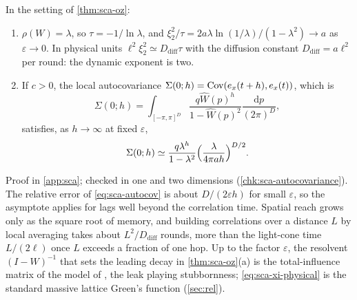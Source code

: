 \begin{proposition}\label{prop:sca-diffusive-scaling}
In the setting of \cref{thm:sca-oz}:
\begin{enumerate}
\item[(a)] $\rho(W)=\lambda$, so $\tau=-1/\ln\lambda$, and $\xi_2^2/\tau=2a\lambda\ln(1/\lambda)/(1-\lambda^2)\to a$ as $\varepsilon\to0$. In physical units $\ell^2\xi_2^2\simeq D_{\mathrm{diff}}\tau$ with the diffusion constant $D_{\mathrm{diff}}=a\ell^2$ per round: the dynamic exponent is two.
\item[(b)] If $c>0$, the local autocovariance $\Sigma(0;h)=\operatorname{Cov}(e_x(t+h),e_x(t))$, which is
\begin{equation}\label{eq:sca-autocov-def}
\Sigma(0;h)=\int_{[-\pi,\pi]^D}\frac{q\hat W(p)^h}{1-\hat W(p)^2}\frac{\mathrm{d}p}{(2\pi)^D},
\end{equation}
satisfies, as $h\to\infty$ at fixed $\varepsilon$,
\begin{equation}\label{eq:sca-autocov}
\Sigma(0;h)\simeq\frac{q\lambda^h}{1-\lambda^2}\Bigl(\frac{\lambda}{4\pi ah}\Bigr)^{D/2}.
\end{equation}
\end{enumerate}
\end{proposition}
Proof in \cref{app:sca}; checked in one and two dimensions (\cref{chk:sca-autocovariance}). The relative error of \eqref{eq:sca-autocov} is about $D/(2\varepsilon h)$ for small $\varepsilon$, so the asymptote applies for lags well beyond the correlation time. Spatial reach grows only as the square root of memory, and building correlations over a distance $L$ by local averaging takes about $L^2/D_{\mathrm{diff}}$ rounds, more than the light-cone time $L/(2\ell)$ once $L$ exceeds a fraction of one hop. Up to the factor $\varepsilon$, the resolvent $(I-W)^{-1}$ that sets the leading decay in \cref{thm:sca-oz}(a) is the total-influence matrix of the model of \citet{friedkin1990social}, the leak playing stubbornness; \eqref{eq:sca-xi-physical} is the standard massive lattice Green's function (\cref{sec:rel}).

